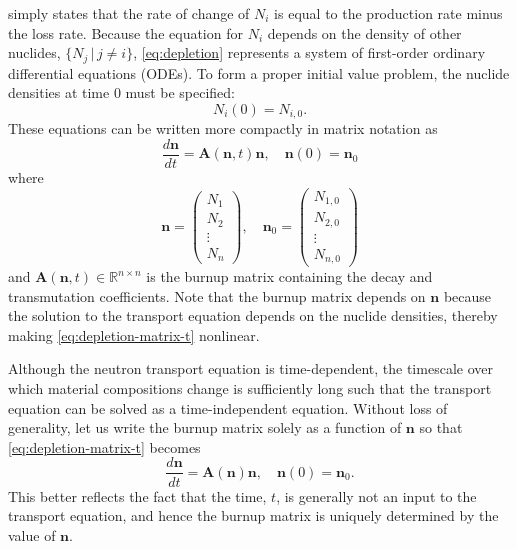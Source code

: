 \documentclass[3p,authoryear]{elsarticle}
\newcommand{\vect}[1]{\mathbf{#1}} %
\begin{document}
 simply states that the rate of change of $N_i$ is equal to
the production rate minus the loss rate. Because the equation for $N_i$ depends
on the density of other nuclides, $\{N_j \,|\, j \ne i\}$, \cref{eq:depletion}
represents a system of first-order ordinary differential equations (ODEs). To
form a proper initial value problem, the nuclide densities at time 0 must be
specified:
\begin{equation}
    N_i(0) = N_{i,0}.
\end{equation}
These equations can be written more compactly in matrix notation as
\begin{equation}
  \label{eq:depletion-matrix-t}
  \frac{d\vect{n}}{dt} = \vect{A}(\vect{n},t)\vect{n}, \quad \vect{n}(0) =
  \vect{n}_0
\end{equation}
where
\begin{equation}
  \vect{n} = \begin{pmatrix} N_1 \\ N_2 \\ \vdots \\ N_n \end{pmatrix}, \quad
  \vect{n}_0 = \begin{pmatrix} N_{1,0} \\ N_{2,0} \\ \vdots \\ N_{n,0} \end{pmatrix}
\end{equation}
and $\vect{A}(\vect{n},t) \in \mathbb{R}^{n\times n}$ is the burnup matrix
containing the decay and transmutation coefficients. Note that the burnup matrix
depends on $\vect{n}$ because the solution to the transport equation depends
on the nuclide densities, thereby making \cref{eq:depletion-matrix-t} nonlinear.

Although the neutron transport equation is time-dependent, the timescale over
which material compositions change is sufficiently long such that the transport
equation can be solved as a time-independent equation. Without loss of
generality, let us write the burnup matrix solely as a function of $\vect{n}$
so that \cref{eq:depletion-matrix-t} becomes
\begin{equation}
  \label{eq:depletion-matrix}
  \frac{d\vect{n}}{dt} = \vect{A}(\vect{n})\vect{n}, \quad \vect{n}(0) =
  \vect{n}_0.
\end{equation}
This better reflects the fact that the time, $t$, is generally not an input to
the transport equation, and hence the burnup matrix is uniquely determined by
the value of $\vect{n}$.
\end{document}
